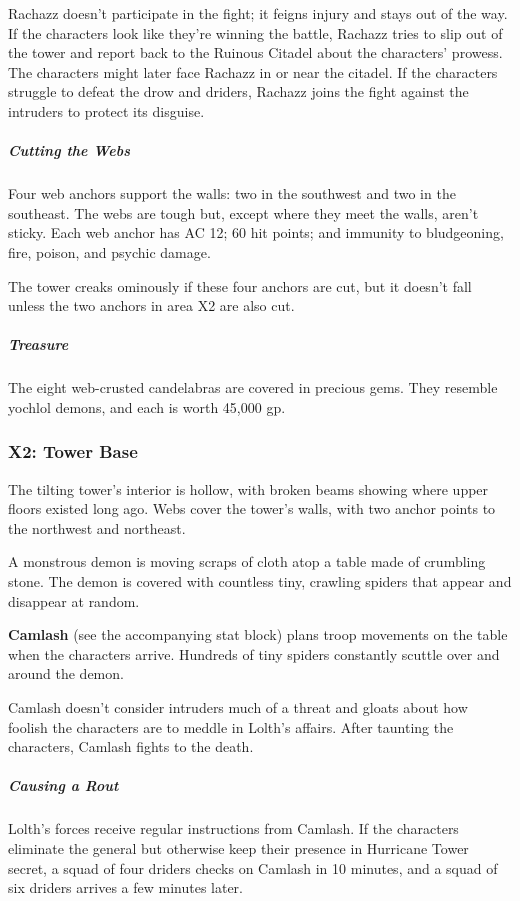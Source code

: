 \documentclass[10pt,a4paper,twoside,bg=print,twocolumn,openany,nodeprecatedcode]{dndbook}
\begin{document}
Rachazz doesn't participate in the fight; it feigns injury and stays out of the way. If the characters look like they're winning the battle, Rachazz tries to slip out of the tower and report back to the Ruinous Citadel about the characters' prowess. The characters might later face Rachazz in or near the citadel. If the characters struggle to defeat the drow and driders, Rachazz joins the fight against the intruders to protect its disguise.

\subparagraph{Cutting the Webs}
Four web anchors support the walls: two in the southwest and two in the southeast. The webs are tough but, except where they meet the walls, aren't sticky. Each web anchor has AC 12; 60 hit points; and immunity to bludgeoning, fire, poison, and psychic damage.

The tower creaks ominously if these four anchors are cut, but it doesn't fall unless the two anchors in area X2 are also cut.

\subparagraph{Treasure}
The eight web-crusted candelabras are covered in precious gems. They resemble yochlol demons, and each is worth 45,000 gp.

\subsubsection{X2: Tower Base}
\begin{DndReadAloud}{}
The tilting tower's interior is hollow, with broken beams showing where upper floors existed long ago. Webs cover the tower's walls, with two anchor points to the northwest and northeast.

A monstrous demon is moving scraps of cloth atop a table made of crumbling stone. The demon is covered with countless tiny, crawling spiders that appear and disappear at random.

\end{DndReadAloud}

\textbf{Camlash} (see the accompanying stat block) plans troop movements on the table when the characters arrive. Hundreds of tiny spiders constantly scuttle over and around the demon.

Camlash doesn't consider intruders much of a threat and gloats about how foolish the characters are to meddle in Lolth's affairs. After taunting the characters, Camlash fights to the death.

\subparagraph{Causing a Rout}
Lolth's forces receive regular instructions from Camlash. If the characters eliminate the general but otherwise keep their presence in Hurricane Tower secret, a squad of four driders checks on Camlash in 10 minutes, and a squad of six driders arrives a few minutes later.
\end{document}
